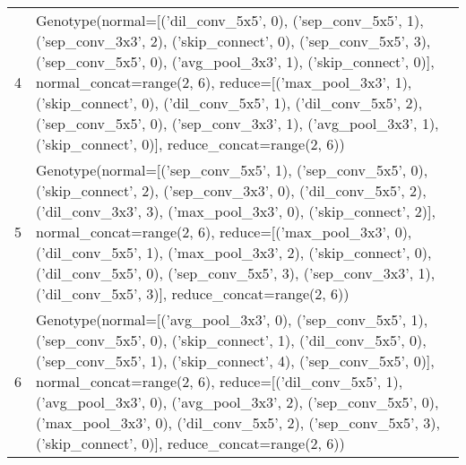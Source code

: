 \documentclass[runningheads]{llncs}
\begin{document}
\begin{table*}
\begin{center}
\begin{footnotesize}
\begin{tabular}{cp{11cm}}
				\\
				4 &  Genotype(normal=[('dil\_conv\_5x5', 0), ('sep\_conv\_5x5', 1), ('sep\_conv\_3x3', 2), ('skip\_connect', 0), ('sep\_conv\_5x5', 3), ('sep\_conv\_5x5', 0), ('avg\_pool\_3x3', 1), ('skip\_connect', 0)], normal\_concat=range(2, 6),
				reduce=[('max\_pool\_3x3', 1), ('skip\_connect', 0), ('dil\_conv\_5x5', 1), ('dil\_conv\_5x5', 2), ('sep\_conv\_5x5', 0), ('sep\_conv\_3x3', 1), ('avg\_pool\_3x3', 1), ('skip\_connect', 0)], reduce\_concat=range(2, 6))
				
				\\
				5 & Genotype(normal=[('sep\_conv\_5x5', 1), ('sep\_conv\_5x5', 0), ('skip\_connect', 2), ('sep\_conv\_3x3', 0), ('dil\_conv\_5x5', 2), ('dil\_conv\_3x3', 3), ('max\_pool\_3x3', 0), ('skip\_connect', 2)], normal\_concat=range(2, 6),
				reduce=[('max\_pool\_3x3', 0), ('dil\_conv\_5x5', 1), ('max\_pool\_3x3', 2), ('skip\_connect', 0), ('dil\_conv\_5x5', 0), ('sep\_conv\_5x5', 3), ('sep\_conv\_3x3', 1), ('dil\_conv\_5x5', 3)], reduce\_concat=range(2, 6))
				
				\\
				6 & Genotype(normal=[('avg\_pool\_3x3', 0), ('sep\_conv\_5x5', 1), ('sep\_conv\_5x5', 0), ('skip\_connect', 1), ('dil\_conv\_5x5', 0), ('sep\_conv\_5x5', 1), ('skip\_connect', 4), ('sep\_conv\_5x5', 0)], normal\_concat=range(2, 6),
				reduce=[('dil\_conv\_5x5', 1), ('avg\_pool\_3x3', 0), ('avg\_pool\_3x3', 2), ('sep\_conv\_5x5', 0), ('max\_pool\_3x3', 0), ('dil\_conv\_5x5', 2), ('sep\_conv\_5x5', 3), ('skip\_connect', 0)], reduce\_concat=range(2, 6))
				\\
				\hline
			\end{tabular}
		\end{footnotesize}
	\end{center}
\end{table*}
\clearpage


\end{document}
